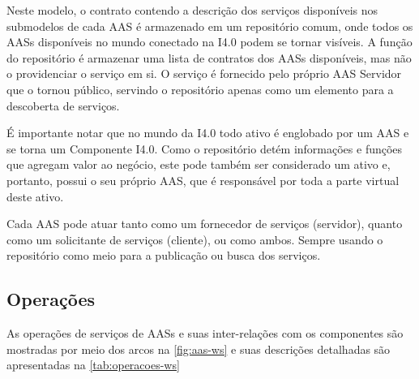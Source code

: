 Neste modelo, o contrato contendo a descrição dos serviços disponíveis nos submodelos de cada AAS é armazenado em um repositório comum, onde todos os AASs disponíveis no mundo conectado na I4.0 podem se tornar visíveis. A função do repositório é armazenar uma lista de contratos dos AASs disponíveis, mas não o providenciar o serviço em si. O serviço é fornecido pelo próprio AAS Servidor que o tornou público, servindo o repositório apenas como um elemento para a descoberta de serviços.

É importante notar que no mundo da I4.0 todo ativo é englobado por um AAS e se torna um Componente I4.0. Como o repositório detém informações e funções que agregam valor ao negócio, este pode também ser considerado um ativo e, portanto, possui o seu próprio AAS, que é responsável por toda a parte virtual deste ativo.

Cada AAS pode atuar tanto como um fornecedor de serviços (servidor), quanto como um solicitante de serviços (cliente), ou como ambos. Sempre usando o repositório como meio para a publicação ou busca dos serviços.

\subsection{Operações}

As operações de serviços de AASs e suas inter-relações com os componentes são mostradas por meio dos arcos na \autoref{fig:aas-ws} e suas descrições detalhadas são apresentadas na \autoref{tab:operacoes-ws}

